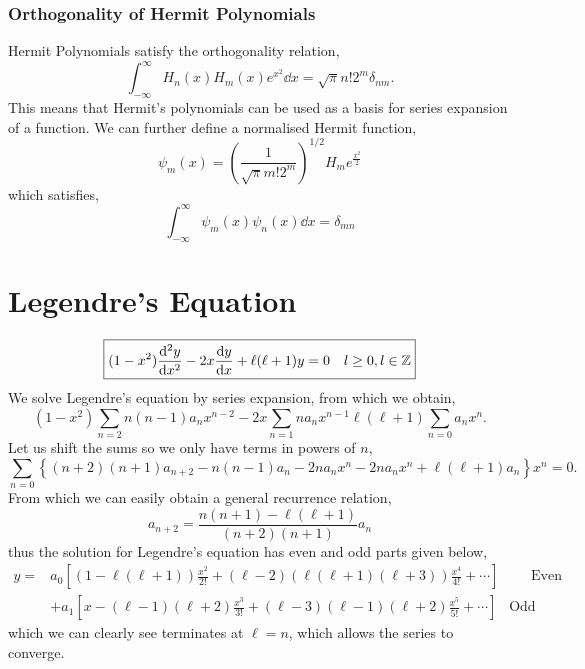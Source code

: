 \documentclass{book}
\begin{document}
\subsubsection{Orthogonality of Hermit Polynomials}
Hermit Polynomials satisfy the orthogonality relation,
\begin{equation}
	\int_{-\infty}^{\infty}H_n(x)H_m(x)e^{x^2}\dd{x} = \sqrt{\pi}n!2^m \delta_{nm}.
\end{equation}
This means that Hermit's polynomials can be used as a basis for series expansion of a function. We can further define a normalised Hermit function,
\begin{equation}
	\psi_m(x) = \left(\frac{1}{\sqrt{\pi}m!2^m}\right)^{1/2}H_me^{\frac{x^2}{2}}
\end{equation}
which satisfies,
\begin{equation}
	\int_{-\infty}^{\infty}\psi_m(x)\psi_n(x)\dd{x} = \delta_{mn}
\end{equation}
\section{Legendre's Equation}
\begin{equation}
	\boxed{(1-x^2)\dv[2]{y}{x} - 2x\dv{y}{x} + \ell(\ell + 1)y = 0 \hspace{10pt} l\geq 0, l \in \mathbb{Z}} \label{eq:legendre}
\end{equation}
We solve Legendre's equation by series expansion, from which we obtain,
\begin{equation}
	(1-x^2)\sum_{n=2} n(n-1)a_nx^{n-2} -2x\sum_{n=1}na_nx^{n-1} \ell(\ell + 1)\sum_{n=0}a_nx^n.
\end{equation}
Let us shift the sums so we only have terms in powers of $n$,
\begin{equation}
	\sum_{n=0} \left\{(n+2)(n+1)a_{n+2} - n(n-1)a_n - 2na_nx^n - 2na_nx^n + \ell(\ell + 1)a_n\right\}x^n = 0.
\end{equation}
From which we can easily obtain a general recurrence relation,
\begin{equation}
	\boxed{a_{n+2} = \frac{n(n+1) - \ell(\ell +1)}{(n+2)(n+1)}a_n}
\end{equation}
thus the solution for Legendre's equation has even and odd parts given below,
\begin{equation}
	\begin{split}
	y = & a_0\left[(1 - \ell(\ell +1))\frac{x^2}{2!} + (\ell - 2)(\ell(\ell +1)(\ell +3))\frac{x^4}{4!} + \cdots \right] \hspace{27pt} \text{Even} \\
	& + a_1\left[x - (\ell - 1)(\ell +2)\frac{x^3}{3!} + (\ell -3)(\ell -1)(\ell +2)\frac{x^5}{5!} + \cdots\right] \hspace{10pt} \text{Odd}
\end{split}
\end{equation}
which we can clearly see terminates at $\ell = n$, which allows the series to converge. 
\end{document}
